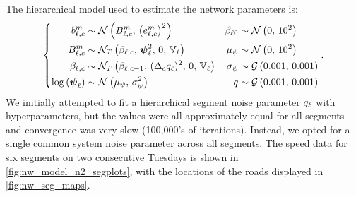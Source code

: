 The hierarchical model used to estimate the network parameters is:
\begin{equation}
\label{eq:tt_hist_hier}
\left\{
\begin{split}
b_{\ell,c}^m &\sim \mathcal{N}\left(B_{\ell,c}^m,\, \left(e_{\ell,c}^m\right)^2\right) &
\beta_{\ell0} &\sim \mathcal{N}\left(0,\, 10^2\right) \\
B_{\ell,c}^m &\sim \mathcal{N}_T\left(\beta_{\ell,c},\, \mathbf{\boldsymbol{\psi}}_{\ell}^2,\, 0,\, \mathbb{V}_\ell\right) &
\mu_\psi &\sim \mathcal{N}\left(0,\, 10^2\right) \\
\beta_{\ell,c} &\sim \mathcal{N}_T\left(\beta_{\ell,c-1},\, (\Delta_c q_{\ell})^2,\, 0,\, \mathbb{V}_\ell\right) &
\sigma_\psi &\sim \mathcal{G}\left(0.001,\, 0.001\right) \\
\log\left(\mathbf{\boldsymbol{\psi}}_{\ell}\right) &\sim \mathcal{N}\left(\mu_\psi,\, \sigma_\psi^2\right) &
q &\sim \mathcal{G}\left(0.001,\, 0.001\right)
\end{split}
\right. .
\end{equation}
We initially attempted to fit a hierarchical segment noise parameter $q_{\ell}$ with hyperparameters, but the values were all approximately equal for all segments and convergence was very slow (100,000's of iterations). Instead, we opted for a single common system noise parameter across all segments. The speed data for six segments on two consecutive Tuesdays is shown in \cref{fig:nw_model_n2_segplots}, with the locations of the roads displayed in \cref{fig:nw_seg_maps}.

